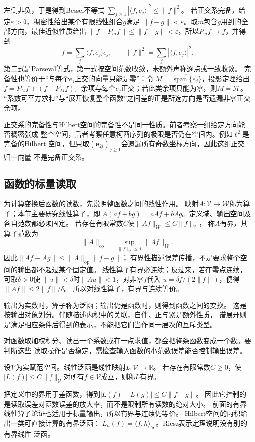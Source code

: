 左侧非负，于是得到Bessel不等式
$\sum_{j\geq1}|\langle f,e_j\rangle|^2\leq\lVert f\rVert^2$。
若正交系完备，给定$\varepsilon>0$，稠密性给出某个有限线性组合$g$满足
$\lVert f-g\rVert<\varepsilon$。取$m$包含$g$用到的全部方向，最佳近似性质给出
$\lVert f-P_mf\rVert\leq\lVert f-g\rVert<\varepsilon$。所以$P_mf\to f$，并得到
\[
 f=\sum_j\langle f,e_j\rangle e_j,\qquad
 \lVert f\rVert^2=\sum_j|\langle f,e_j\rangle|^2.
\]
第二式是Parseval等式，第一式按空间范数收敛，未额外声称逐点或一致收敛。
完备性也等价于“与每个$e_j$正交的向量只能是零”：令
$M=\overline{\operatorname{span}\{e_j\}}$，投影定理给出
$f=P_Mf+(f-P_Mf)$，余项与每个$e_j$正交；若此类余项只能为零，则$M=\mathcal H$。
“系数可平方求和”与“展开恢复整个函数”之间差的正是所选方向是否遗漏非零正交余项。

正交系的完备性与Hilbert空间的完备性不是同一性质。前者考察一组给定方向能否稠密张成
整个空间，后者考察任意柯西序列的极限是否仍在空间内。例如$\ell^2$是完备的Hilbert
空间，但只取$(\bm{e}_{2j})_{j\geq1}$会遗漏所有奇数坐标方向，因此这组正交归一向量
不是完备正交系。

\subsection{函数的标量读取}
\label{sec:functional-scalar-readouts}
\label{sec:functional-positive-kernels-rkhs}


为计算变换后函数的读数，先说明整函数之间的线性作用。
映射$A:\mathcal V\to\mathcal W$称为算子；本节主要研究线性算子，即
$A(af+bg)=aAf+bAg$。定义域、输出空间及各自范数都必须固定。
若存在有限常数$C$使$\lVert Af\rVert_{\mathcal W}\leq C\lVert f\rVert_{\mathcal V}$，
称$A$有界，其算子范数为
\[
 \lVert A\rVert_{\mathrm{op}}
 =\sup_{\lVert f\rVert_{\mathcal V}\leq1}\lVert Af\rVert_{\mathcal W}.
\]
因此$\lVert Af-Ag\rVert\leq\lVert A\rVert_{\mathrm{op}}\lVert f-g\rVert$；
有界性描述误差传播，不是要求整个空间的输出都不超过某个固定值。
线性算子有界必连续；反过来，若在零点连续，可取$\delta>0$使
$\lVert u\rVert<\delta$时$\lVert Au\rVert<1$，对非零$f$代入
$u=\delta f/(2\lVert f\rVert)$，便得$\lVert Af\rVert\leq2\lVert f\rVert/\delta$。
所以对线性算子，有界与连续等价。

输出为实数时，算子称为泛函；输出仍是函数时，则得到函数之间的变换。
这是按输出对象划分。伴随描述内积中的关联，自伴、正与紧是额外性质，
谱展开则是满足相应条件后得到的表示，不能把它们当作同一层次的互斥类型。

对函数取加权积分、读出一个系数或在一点求值，都会把整条函数变成一个数。要判断这些
读取操作是否稳定，需检查输入函数的小范数误差能否控制输出误差。
\begin{definition}[有界线性泛函]
\label{def:functional-bounded-linear-functional}
设$\mathcal V$为实赋范空间。线性泛函是线性映射$L:\mathcal V\to\mathbb R$。
若存在有限常数$C\geq0$，使
$|L(f)|\leq C\lVert f\rVert_{\mathcal V}$对所有$f\in\mathcal V$成立，则称$L$有界。
\end{definition}
把定义中的界用于差函数，得到$|L(f)-L(g)|\leq C\lVert f-g\rVert$。
因此它控制的是读取误差对函数误差的放大率，而不是限制所有读数的绝对大小。
前面的有界线性算子论证也适用于标量输出，所以有界与连续仍等价。
Hilbert空间的内积给出一类可直接计算的有界泛函：
$L_h(f)=\langle f,h\rangle_{\mathcal{H}}$。Riesz表示定理说明没有别的有界线性
泛函。

